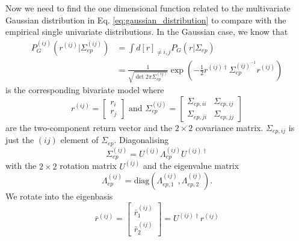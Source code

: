 Now we need to find the one dimensional function related to the multivariate
Gaussian distribution in Eq. \ref{eq:gaussian_distribution} to compare with the
empirical  single univariate distributions. In the Gaussian case, we know that
\begin{align}
    P_{G}^{\left( ij \right)} \left( r^{\left( ij \right)} |
    \Sigma_{ep}^{\left( ij \right)} \right)
    &= \int d \left[ r \right]_{\ne i,j} P_{G} \left( r | \Sigma_{ep} \right)\\
    &= \frac{1}{\sqrt{\det 2 \pi \Sigma_{ep}^{\left( ij \right)}}}
    \exp \left( -\frac{1}{2} r^{\left( ij \right) \dagger}
    \Sigma_{ep}^{\left( ij \right)^{ - 1}} r^{\left( ij \right)} \right)
\end{align}
is the corresponding bivariate model where
\begin{equation}
    r^{\left(ij\right)}=\left[\begin{array}{c}
    r_{i}\\
    r_{j}
    \end{array}\right]\text{ and } \Sigma_{ep}^{\left(ij\right)}
    =\left[\begin{array}{cc}
    \Sigma_{ep,ii} & \Sigma_{ep,ij}\\
    \Sigma_{ep,ji} & \Sigma_{ep,jj}
    \end{array}\right]
\end{equation}
are the two-component return vector and the $2 \times 2$ covariance matrix.
$\Sigma_{ep,ij}$ is just the $\left( ij \right)$ element of $\Sigma_{ep}$.
Diagonalising
\begin{equation}
    \Sigma_{ep}^{\left(ij\right)}=U^{\left(ij\right)}
    \Lambda_{ep}^{\left(ij\right)}U^{\left(ij\right)\dagger}
\end{equation}
with the $2 \times 2$ rotation matrix $U^{\left( ij \right)}$ and the
eigenvalue matrix
\begin{equation}
    \Lambda_{ep}^{\left( ij \right)} = \text{diag}
    \left( \Lambda_{ep,1}^{\left( ij \right)},
    \Lambda_{ep,2}^{\left( ij \right)} \right).
\end{equation}
We rotate into the eigenbasis
\begin{equation}
    \bar{r}^{\left(ij\right)}=\left[\begin{array}{c}
    \bar{r}_{1}^{\left(ij\right)}\\
    \bar{r}_{2}^{\left(ij\right)}
    \end{array}\right]=U^{\left(ij\right)\dagger}r^{\left(ij\right)}
\end{equation}

